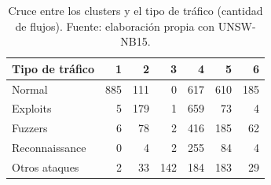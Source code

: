 \begin{table}[htbp]
  \centering
  \caption[Cruce entre clusters y tipo de tráfico]{Cruce entre los clusters y el tipo de tráfico (cantidad de flujos). Fuente: elaboración propia con UNSW-NB15.}\label{tab:a-cluster-tipo}
  \begin{tablacompacta}
  \begin{tabular}{@{}lrrrrrr@{}}
  \toprule
  Tipo de tráfico & 1 & 2 & 3 & 4 & 5 & 6 \\
  \midrule
  Normal & 885 & 111 & 0 & 617 & 610 & 185 \\
  Exploits & 5 & 179 & 1 & 659 & 73 & 4 \\
  Fuzzers & 6 & 78 & 2 & 416 & 185 & 62 \\
  Reconnaissance & 0 & 4 & 2 & 255 & 84 & 4 \\
  Otros ataques & 2 & 33 & 142 & 184 & 183 & 29 \\
  \bottomrule
  \end{tabular}
  \end{tablacompacta}
\end{table}
\FloatBarrier
